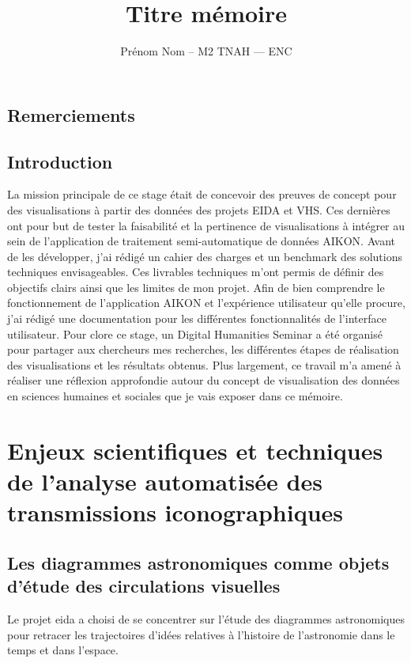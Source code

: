 \documentclass[a4paper,12pt,twoside]{book}
\author{Prénom Nom – M2 TNAH — ENC}
\title{Titre mémoire}
\newcommand\chapterNo[1]{
	\chapter*{#1}
	\markright{\MakeUppercase{#1}}
}
\begin{document}
	\onehalfspacing
	\frontmatter

	

	\thispagestyle{empty}
	\cleardoublepage

	

	\chapterNo{Remerciements}

	\chapterNo{Introduction}

	La mission principale de ce stage était de concevoir des preuves de concept pour des visualisations à partir des données des projets EIDA et VHS. Ces dernières ont pour but de tester la faisabilité et la pertinence de visualisations à intégrer au sein de l’application de traitement semi-automatique de données AIKON. Avant de les développer, j’ai rédigé un cahier des charges et un benchmark des solutions techniques envisageables. Ces livrables techniques m’ont permis de définir des objectifs clairs ainsi que les limites de mon projet. Afin de bien comprendre le fonctionnement de l’application AIKON et l’expérience utilisateur qu’elle procure, j’ai rédigé une documentation pour les différentes fonctionnalités de l’interface utilisateur. Pour clore ce stage, un Digital Humanities Seminar a été organisé pour partager aux chercheurs mes recherches, les différentes étapes de réalisation des visualisations et les résultats obtenus. Plus largement, ce travail m’a amené à réaliser une réflexion approfondie autour du concept de visualisation des données en sciences humaines et sociales que je vais exposer dans ce mémoire.

	\thispagestyle{empty}
	\cleardoublepage

	\mainmatter

	\part{Enjeux scientifiques et techniques de l'analyse automatisée des transmissions iconographiques}
	\chapter[Les diagrammes astronomiques]{Les diagrammes astronomiques comme objets d'étude des circulations visuelles}

	Le projet \gls{eida} a choisi de se concentrer sur l'étude des diagrammes astronomiques pour retracer les trajectoires d'idées relatives à l'histoire de l'astronomie dans le temps et dans l'espace.
\end{document}
